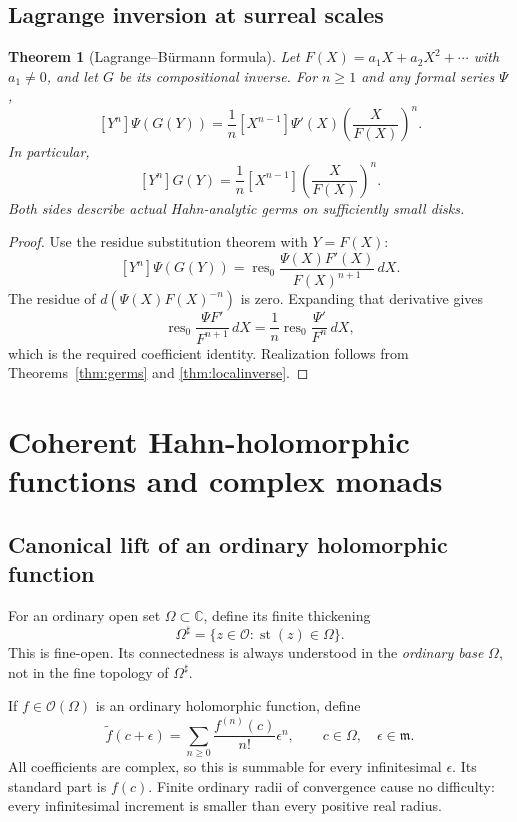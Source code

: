 \documentclass[11pt,a4paper]{article}
\numberwithin{equation}{section}
\newtheorem{theorem}{Theorem}[section]
\theoremstyle{definition}
\theoremstyle{remark}
\newcommand{\C}{\mathbb C}
\newcommand{\OO}{\mathcal O}
\newcommand{\mm}{\mathfrak m}
\newcommand{\st}{\operatorname{st}}
\newcommand{\res}{\operatorname{res}}
\begin{document}
\subsection{Lagrange inversion at surreal scales}
\begin{theorem}[Lagrange--B\"urmann formula]
\label{thm:lagrange}
Let $F(X)=a_1X+a_2X^2+\cdots$ with $a_1\ne0$, and let $G$ be its compositional inverse. For $n\geq1$ and any formal series $\Psi$,
\[
 [Y^n]\Psi(G(Y))
 =\frac1n[X^{n-1}]\Psi'(X)\left(\frac X{F(X)}\right)^n.
\]
In particular,
\[
 [Y^n]G(Y)=\frac1n[X^{n-1}]\left(\frac X{F(X)}\right)^n.
\]
Both sides describe actual Hahn-analytic germs on sufficiently small disks.
\end{theorem}
\begin{proof}
Use the residue substitution theorem with $Y=F(X)$:
\[
 [Y^n]\Psi(G(Y))
 =\res_0\frac{\Psi(X)F'(X)}{F(X)^{n+1}}\,dX.
\]
The residue of $d(\Psi(X)F(X)^{-n})$ is zero. Expanding that derivative gives
\[
 \res_0\frac{\Psi F'}{F^{n+1}}\,dX
 =\frac1n\res_0\frac{\Psi'}{F^n}\,dX,
\]
which is the required coefficient identity. Realization follows from Theorems~\ref{thm:germs} and \ref{thm:localinverse}.
\end{proof}

\section{Coherent Hahn-holomorphic functions and complex monads}
\label{sec:coherent}
\subsection{Canonical lift of an ordinary holomorphic function}
For an ordinary open set $\Omega\subset\C$, define its finite thickening
\[
 \Omega^\sharp=\{z\in\OO:\st(z)\in\Omega\}.
\]
This is fine-open. Its connectedness is always understood in the \emph{ordinary base} $\Omega$, not in the fine topology of $\Omega^\sharp$.

If $f\in\OO(\Omega)$ is an ordinary holomorphic function, define
\begin{equation}
\label{eq:lift}
 \widetilde f(c+\epsilon)
 =\sum_{n\geq0}\frac{f^{(n)}(c)}{n!}\epsilon^n,
 \qquad c\in\Omega,\quad\epsilon\in\mm.
\end{equation}
All coefficients are complex, so this is summable for every infinitesimal $\epsilon$. Its standard part is $f(c)$. Finite ordinary radii of convergence cause no difficulty: every infinitesimal increment is smaller than every positive real radius.
\end{document}
